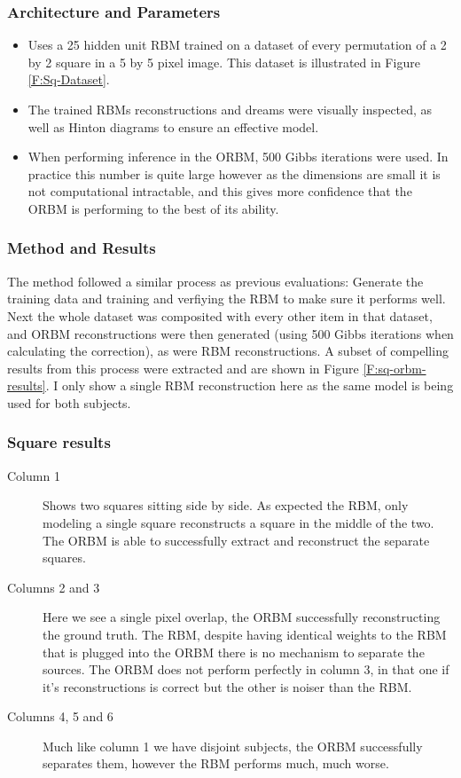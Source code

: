 \subsubsection{Architecture and Parameters}
\begin{itemize}
  \item Uses a 25 hidden unit RBM trained on a dataset of every permutation of a 2 by 2 square in a 5 by 5 pixel image. This dataset is illustrated in Figure \ref{F:Sq-Dataset}.
  \item The trained RBMs reconstructions and dreams were visually inspected, as well as Hinton diagrams to ensure an effective model.
  \item When performing inference in the ORBM, 500 Gibbs iterations were used. In practice this number is quite large however as the dimensions are small it is not computational intractable, and this gives more confidence that the ORBM is performing to the best of its ability.
\end{itemize}

\subsubsection{Method and Results}

The method followed a similar process as previous evaluations: Generate the training data and training and verfiying the RBM to make sure it performs well.
Next the whole dataset was composited with every other item in that dataset, and ORBM reconstructions were then generated (using 500 Gibbs iterations when calculating the correction), as were RBM reconstructions.
A subset of compelling results from this process were extracted and are shown in Figure \ref{F:sq-orbm-results}. I only show a single RBM reconstruction here as the same model is being used for both subjects.

\subsubsection{Square results}
\begin{description}
  \item[Column 1] Shows two squares sitting side by side. As expected the RBM, only modeling a single square reconstructs a square in the middle of the two. The ORBM is able to successfully extract and reconstruct the separate squares.
  \item[Columns 2 and 3] Here we see a single pixel overlap, the ORBM successfully reconstructing the ground truth. The RBM, despite having identical weights to the RBM that is plugged into the ORBM there is no mechanism to separate the sources. The ORBM does not perform perfectly in column 3, in that one if it's reconstructions is correct but the other is noiser than the RBM.
  \item[Columns 4, 5 and 6] Much like column 1 we have disjoint subjects, the ORBM successfully separates them, however the RBM performs much, much worse.
\end{description}

